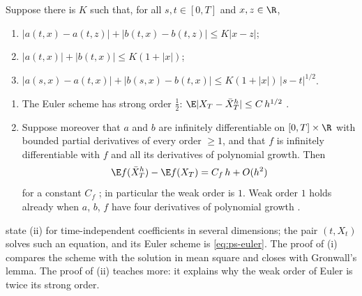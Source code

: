 \begin{theorem}\label{thm:ps-euler}
Suppose there is $K$ such that, for all $s,t\in[0,T]$ and $x,z\in\R$,
\begin{enumerate}[label=(A\arabic*)]
  \item $|a(t,x)-a(t,z)|+|b(t,x)-b(t,z)|\le K|x-z|$;
  \item $|a(t,x)|+|b(t,x)|\le K(1+|x|)$;
  \item $|a(s,x)-a(t,x)|+|b(s,x)-b(t,x)|\le K(1+|x|)\,|s-t|^{1/2}$.
\end{enumerate}
\begin{enumerate}[label=(\roman*)]
  \item The Euler scheme has strong order $\frac12$: $\E|X_T-\bar X^h_T|\le C\,h^{1/2}$
    \citep[Theorem~10.2.2]{kloeden-platen}.
  \item Suppose moreover that $a$ and $b$ are infinitely differentiable on $[0,T]\times\R$
    with bounded partial derivatives of every order $\ge1$, and that $f$ is infinitely
    differentiable with $f$ and all its derivatives of polynomial growth. Then
    \begin{equation}\label{eq:ps-tt}
      \E f(\bar X^h_T)-\E f(X_T)=C_f\,h+O(h^2)
    \end{equation}
    for a constant $C_f$ \citep{talay-tubaro}; in particular the weak order is $1$.
    Weak order $1$ holds already when $a$, $b$, $f$ have four derivatives of polynomial
    growth \citep[Theorem~14.5.1 with $\beta=1$]{kloeden-platen}.
\end{enumerate}
\end{theorem}

 state (ii) for time-independent coefficients in several dimensions;
the pair $(t,X_t)$ solves such an equation, and its Euler scheme is \eqref{eq:ps-euler}. The
proof of (i) compares the scheme with the solution in mean square and closes with
Gronwall's lemma. The proof of (ii) teaches more: it explains why the weak order of Euler is
twice its strong order.

